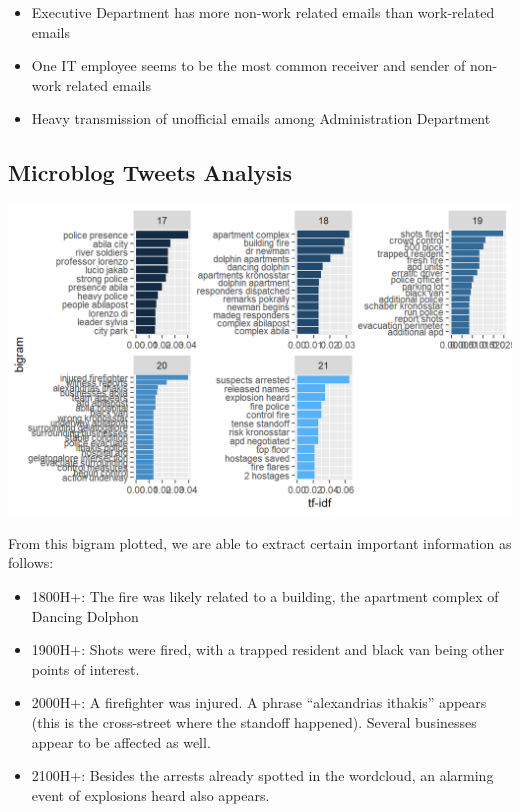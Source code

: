 \documentclass{acm_proc_article-sp}
\providecommand{\tightlist}{%
  \setlength{\itemsep}{0pt}\setlength{\parskip}{0pt}}
\begin{document}
\begin{itemize}
\tightlist
\item
  Executive Department has more non-work related emails than
  work-related emails
\item
  One IT employee seems to be the most common receiver and sender of
  non-work related emails
\item
  Heavy transmission of unofficial emails among Administration
  Department
\end{itemize}

\hypertarget{microblog-tweets-analysis}{%
\subsection{Microblog Tweets Analysis}\label{microblog-tweets-analysis}}

\includegraphics{img/image08.png}

From this bigram plotted, we are able to extract certain important
information as follows:

\begin{itemize}
\tightlist
\item
  1800H+: The fire was likely related to a building, the apartment
  complex of Dancing Dolphon
\item
  1900H+: Shots were fired, with a trapped resident and black van being
  other points of interest.
\item
  2000H+: A firefighter was injured. A phrase ``alexandrias ithakis''
  appears (this is the cross-street where the standoff happened).
  Several businesses appear to be affected as well.
\item
  2100H+: Besides the arrests already spotted in the wordcloud, an
  alarming event of explosions heard also appears.
\end{itemize}
\end{document}
